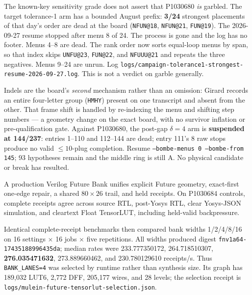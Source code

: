 \documentclass[11pt,a4paper]{article}
\begin{document}
The known-key sensitivity grade does not assert that P1030680 \emph{is} garbled.
The target tolerance-1 arm has a bounded August prefix:
\textbf{3/24} strongest placements of that day's order are dead at the board
(\texttt{NFUN@18}, \texttt{NFUN@21}, \texttt{FUN@19}). The 2026-09-27 resume
stopped after menu 8 of 24. The process is gone and the log has no footer.
Menus 4--8 are dead. The rank order now sorts equal-loop menus by span, so that
index skips \texttt{UNFU@23}, \texttt{FUN@22}, and \texttt{NFUUU@21} and repeats
the three negatives. Menus 9--24 are unrun. Log
\texttt{logs/campaign-tolerance1-strongest-resume-2026-09-27.log}.
This is not a verdict on garble generally.

Indels are the board's \emph{second} mechanism rather than an omission: Girard
records an entire four-letter group (\texttt{HMHY}) present on one transcript and
absent from the other. That frame shift is handled by re-indexing the menu and
shifting step numbers --- a geometry change on the exact board, with no survivor
inflation or pre-qualification gate. Against P1030680, the post-gap $\delta=4$ arm
is \textbf{suspended at 144/237}: entries 1--110 and 112--144 are dead; entry 111's
8 raw stops produce no valid $\le10$-plug completion. Resume
\texttt{--bombe-menus 0 --bombe-from 145}; 93 hypotheses remain and the middle ring is still A.
No physical candidate or break has resulted.

A production Verilog Future Bank unifies explicit Future geometry, exact-first
one-edge repair, a shared $80\times26$ trail, and held receipts. On P1030684
controls, complete receipts agree across source RTL, post-Yosys RTL, clear
Yosys-JSON simulation, and cleartext Float TensorLUT, including held-valid
backpressure.

Identical complete-receipt benchmarks then compared bank widths 1/2/4/8/16 on
16 settings $\times$ 16 jobs $\times$ five repetitions. All widths produced digest
\texttt{fnv1a64-17435188996435da}; median rates were 233.777350172,
264.718510307, \textbf{276.035471632}, 273.889660462, and 230.780129610
receipts/s. Thus \texttt{BANK\_LANES=4} was selected by runtime rather than
synthesis size. Its graph has 189{,}032 LUT6, 2{,}772 DFF, 205{,}177 wires, and
28 levels; the selection receipt is
\texttt{logs/mulein-future-tensorlut-selection.json}.
\end{document}
